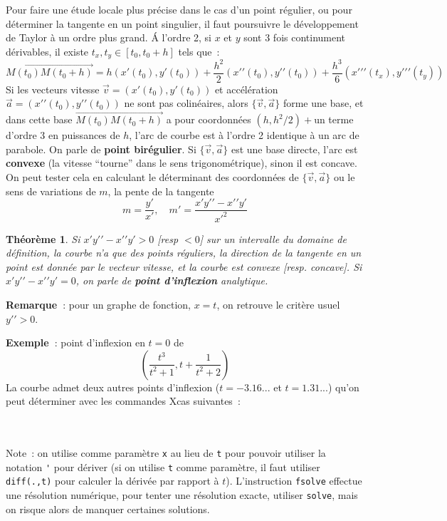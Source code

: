 \documentclass[a4paper,11pt]{article}
\newtheorem{thm}{Théorème}
\begin{document}
\begin{giacjshere}
Pour faire une \'etude locale plus pr\'ecise dans le cas d'un point
r\'egulier, ou pour d\'eterminer la tangente en un point singulier,
il faut poursuivre le d\'eveloppement de Taylor \`a un ordre plus
grand. \'A l'ordre 2, si $x$ et $y$ sont 3 fois continument
d\'erivables, il existe $t_x,t_y\in [t_0,t_0+h]$ tels que~:
$$\overrightarrow{M(t_0)M(t_0+h)}= 
h (x'(t_0),y'(t_0))+\frac{h^2}{2}(x'{'}(t_0),y'{'}(t_0))
+\frac{h^3}{6}(x'{'}'(t_x),y'{'}'(t_y))
$$
Si les vecteurs vitesse $\overrightarrow{v}=(x'(t_0),y'(t_0))$
et acc\'el\'eration $\overrightarrow{a}=(x'{'}(t_0),y'{'}(t_0))$
ne sont pas colin\'eaires, 
alors $\{\overrightarrow{v},\overrightarrow{a}\}$ forme 
une base, et dans cette base $\overrightarrow{M(t_0)M(t_0+h)}$
a pour coordonn\'ees $(h,h^2/2)+$un terme d'ordre 3 en puissances de $h$, l'arc
de courbe est \`a l'ordre 2 identique \`a un arc de parabole. 
On parle de {\bf point bir\'egulier}.
Si $\{\overrightarrow{v},\overrightarrow{a}\}$ est une base directe,
l'arc est {\bf convexe} (la vitesse
``tourne'' dans le sens trigonom\'etrique),
sinon il est concave. On peut tester cela en calculant
le d\'eterminant des coordonn\'ees de $\{\overrightarrow{v},\overrightarrow{a}\}$ ou le sens
de variations de $m$, la pente de la tangente 
\[ m=\frac{y'}{x'}, \quad m'=\frac{x'y'{'}-x'{'}y'}{x'^2} \]

\begin{thm}
Si $x'y'{'}-x'{'}y'>0$ [resp $<0$] sur un intervalle du domaine de d\'efinition,
la courbe n'a que des points r\'eguliers, la direction de la tangente en un point
est donn\'ee par le vecteur vitesse, et la courbe est convexe
[resp. concave].
Si $x'y'{'}-x'{'}y'=0$, on parle de {\bf point d'inflexion} analytique.
\end{thm}
{\bf Remarque~}: pour un graphe de fonction, $x=t$, on retrouve le
crit\`ere usuel $y'{'}>0$.

{\bf Exemple~}: point d'inflexion en $t=0$ de
$$ (\frac{t^3}{t^2+1},t+\frac{1}{t^2+2}) $$
La courbe admet deux autres points d'inflexion ($t=-3.16...$ et
$t=1.31...$) qu'on peut d\'eterminer avec les commandes Xcas suivantes~:\\
\\
\\

Note~: on utilise comme param\`etre \verb|x| au lieu de \verb|t| pour pouvoir 
utiliser la notation \verb|'| pour d\'eriver (si on utilise \verb|t|
comme param\`etre, il faut utiliser \verb|diff(.,t)| pour calculer
la d\'eriv\'ee par rapport \`a $t$). L'instruction \verb|fsolve|
effectue une r\'esolution num\'erique, pour tenter une r\'esolution
exacte, utiliser \verb|solve|, mais on risque alors de manquer
certaines solutions.


\end{giacjshere}
\end{document}
